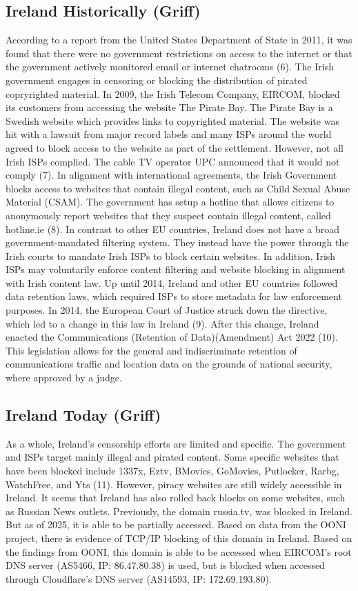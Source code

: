 \subsection{Ireland Historically (Griff)}
According to a report from the United States Department of State in 2011, it was
found that there were no government restrictions on access to the internet or that the
government actively monitored email or internet chatrooms (6).
The Irish government engages in censoring or blocking the distribution of pirated
copryrighted material. In 2009, the Irish Telecom Company, EIRCOM, blocked its
customers from accessing the website The Pirate Bay. The Pirate Bay is a Swedish
website which provides links to copyrighted material. The website was hit with a
lawsuit from major record labels and many ISPs around the world agreed to block
access to the website as part of the settlement. However, not all Irish ISPs complied.
The cable TV operator UPC announced that it would not comply (7).
In alignment with international agreements, the Irish Government blocks access to
websites that contain illegal content, such as Child Sexual Abuse Material (CSAM).
The government has setup a hotline that allows citizens to anonymously report
websites that they suspect contain illegal content, called hotline.ie (8).
In contrast to other EU countries, Ireland does not have a broad
government-mandated filtering system. They instead have the power through the
Irish courts to mandate Irish ISPs to block certain websites. In addition, Irish ISPs
may voluntarily enforce content filtering and website blocking in alignment with
Irish content law.
Up until 2014, Ireland and other EU countries followed data retention laws, which
required ISPs to store metadata for law enforcement purposes. In 2014, the European
Court of Justice struck down the directive, which led to a change in this law in
Ireland (9). After this change, Ireland enacted the Communications (Retention of
Data)(Amendment) Act 2022 (10). This legislation allows for the general and
indiscriminate retention of communications traffic and location data on the grounds
of national security, where approved by a judge.

\subsection{Ireland Today (Griff)}
As a whole, Ireland’s censorship efforts are limited and specific. The government and
ISPs target mainly illegal and pirated content. Some specific websites that have been
blocked include 1337x, Eztv, BMovies, GoMovies, Putlocker, Rarbg, WatchFree, and
Yts (11). However, piracy websites are still widely accessible in Ireland.
It seems that Ireland has also rolled back blocks on some websites, such as Russian
News outlets. Previously, the domain russia.tv, was blocked in Ireland. But as of
2025, it is able to be partially accessed. Based on data from the OONI project, there is
evidence of TCP/IP blocking of this domain in Ireland. Based on the findings from
OONI, this domain is able to be accessed when EIRCOM’s root DNS server (AS5466,
IP: 86.47.80.38) is used, but is blocked when accessed through Cloudflare’s DNS server (AS14593, IP: 172.69.193.80).






